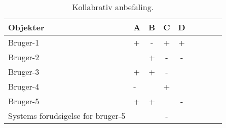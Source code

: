\begin{table}[H]
  \centering
      \begin{tabular}{l|lccccccc}
      \textbf{Objekter}                 & A        & B       & C       & D  \\ \hline
      Bruger-1                           & +        & -       & +       & +  \\
      Bruger-2                           &          & +       & -       & -  \\
      Bruger-3                           & +        & +       & -       &    \\
      Bruger-4  		                      & -        &         & +       &    \\ \hline
      Bruger-5  		                      & +        & +       &         & -  \\ \hline
      Systems forudsigelse for bruger-5  &          &         & -       &    \\


    \end{tabular}
  \caption{Kollabrativ anbefaling. }\label{tabel:kollabrativ}
\end{table}
